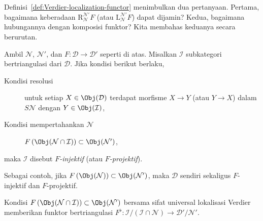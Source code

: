 Definisi~\ref{def:Verdier-localization-functor} menimbulkan dua pertanyaan.
Pertama, bagaimana keberadaan
$\mathrm{R}^{\mathcal{N}'}_{\mathcal{N}}F$ (atau
$\mathrm{L}^{\mathcal{N}'}_{\mathcal{N}}F$) dapat dijamin? Kedua, bagaimana
hubungannya dengan komposisi funktor? Kita membahas keduanya secara berurutan.

\begin{definisi}\label{def:F-injective}
	Ambil $\mathcal{N}$, $\mathcal{N}'$, dan
	$F: \mathcal{D} \to \mathcal{D}'$ seperti di atas. Misalkan $\mathcal{I}$
	subkategori bertriangulasi dari $\mathcal{D}$. Jika kondisi berikut berlaku,
	\begin{description}
		\item[Kondisi resolusi] untuk setiap $X \in \Obj(\mathcal{D})$ terdapat
		morfisme $X \to Y$ (atau $Y \to X$) dalam $S\mathcal{N}$ dengan
		$Y \in \Obj(\mathcal{I})$,
		\item[Kondisi mempertahankan $\mathcal{N}$]
		$F\left(\Obj(\mathcal{N}\cap\mathcal{I})\right)
		\subset \Obj(\mathcal{N}')$,
	\end{description}
	maka $\mathcal{I}$ disebut \emph{$F$-injektif} (atau \emph{$F$-projektif}).
\end{definisi}

Sebagai contoh, jika
$F\left(\Obj(\mathcal{N})\right) \subset \Obj(\mathcal{N}')$, maka
$\mathcal{D}$ sendiri sekaligus $F$-injektif dan $F$-projektif.

Kondisi
$F\left(\Obj(\mathcal{N}\cap\mathcal{I})\right)\subset\Obj(\mathcal{N}')$
bersama sifat universal lokalisasi Verdier memberikan funktor bertriangulasi
$F^\flat: \mathcal{I}/(\mathcal{I}\cap\mathcal{N})
\to \mathcal{D}'/\mathcal{N}'$.

